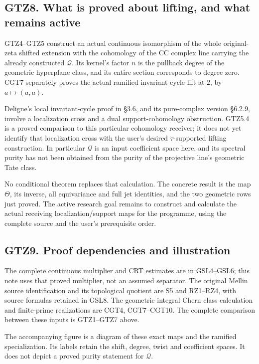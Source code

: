 \subsection{GTZ8. What is proved about lifting, and what remains
active}\label{gtz8.-what-is-proved-about-lifting-and-what-remains-active}

GTZ4--GTZ5 construct an actual continuous isomorphism of the whole
original-zeta shifted extension with the cohomology of the CC complex
line carrying the already constructed \(\mathcal Q\). Its kernel's
factor \(n\) is the pullback degree of the geometric hyperplane class,
and its entire section corresponds to degree zero. CGT7 separately
proves the actual ramified invariant-cycle lift at \(2\), by
\(a\mapsto(a,a)\).

Deligne's local invariant-cycle proof in §3.6, and its pure-complex
version §6.2.9, involve a localization cross and a dual
support-cohomology obstruction. GTZ5.4 is a proved comparison to this
particular cohomology receiver; it does not yet identify that
localization cross with the user's desired \(\tau\)-supported lifting
construction. In particular \(\mathcal Q\) is an input coefficient space
here, and its spectral purity has not been obtained from the purity of
the projective line's geometric Tate class.

No conditional theorem replaces that calculation. The concrete result is
the map \(\Theta\), its inverse, all equivariance and full jet
identities, and the two geometric rows just proved. The active research
goal remains to construct and calculate the actual receiving
localization/support maps for the programme, using the complete source
and the user's prerequisite order.

\subsection{GTZ9. Proof dependencies and
illustration}\label{gtz9.-proof-dependencies-and-illustration}

The complete continuous multiplier and CRT estimates are in GSL4--GSL6;
this note uses that proved multiplier, not an assumed separator. The
original Mellin source identification and its topological quotient are
S5 and RZ1--RZ4, with source formulas retained in GSL8. The geometric
integral Chern class calculation and finite-prime realizations are CGT4,
CGT7--CGT10. The complete comparison between these inputs is GTZ1--GTZ7
above.

The accompanying figure is a diagram of these exact maps and the
ramified specialization. Its labels retain the shift, degree, twist and
coefficient spaces. It does not depict a proved purity statement for
\(\mathcal Q\).

